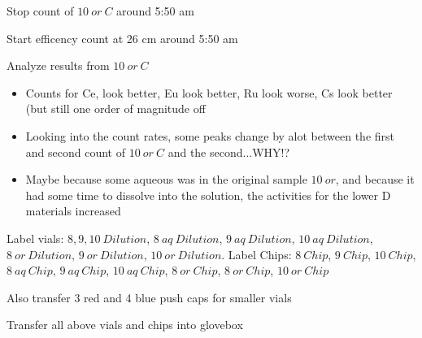 \documentclass[idxtotoc,hyperref,openany,oneside]{labbook} %
\newcommand{\cmark}{\ding{51}}%
\newcommand{\done}{\rlap{$\square$}{\raisebox{2pt}{\large\hspace{1pt}\cmark}}%
  \hspace{-2.5pt}}
\begin{document}



\begin{todolist}
\item[\done]{Stop count of $\boxed{10\ or\ C}$ around 5:50 am}
\item[\done]{Start efficency count at 26 cm around 5:50 am}
\item[\done]{Analyze results from $\boxed{10\ or\ C}$}
  \begin{itemize}
  \item{Counts for Ce, look better, Eu look better,
    Ru look worse, Cs look better (but still one order of magnitude
    off}
  \item{Looking into the count rates, some peaks change by
    alot between the first and second count of $\boxed{10\ or\ C}$
    and the second...WHY!?}
  \item{Maybe because some aqueous was in the original sample
    $\boxed{10\ or}$, and because it had some time to dissolve into
    the solution, the activities for the lower D materials increased}
  \end{itemize}
\end{todolist}

\begin{todolist}
\item[\done]{Label vials: $\boxed{8,9,10\ Dilution}$,
  $\boxed{8\ aq\ Dilution}$,
  $\boxed{9\ aq\ Dilution}$,
  $\boxed{10\ aq\ Dilution}$,
  $\boxed{8\ or\ Dilution}$,
  $\boxed{9\ or\ Dilution}$,
  $\boxed{10\ or\ Dilution}$.
  Label Chips: $\boxed{8\ Chip}$, $\boxed{9\ Chip}$,
  $\boxed{10\ Chip}$,
  $\boxed{8\ aq\ Chip}$, $\boxed{9\ aq\ Chip}$,
  $\boxed{10\ aq\ Chip}$,
  $\boxed{8\ or\ Chip}$, $\boxed{8\ or\ Chip}$,
  $\boxed{10\ or\ Chip}$}
  \begin{todolist}
  \item[\done]{Also transfer 3 red and 4 blue push caps for smaller vials}
  \end{todolist}
\item[\done]{Transfer all above vials and chips into glovebox}
\end{todolist}

\end{document}
